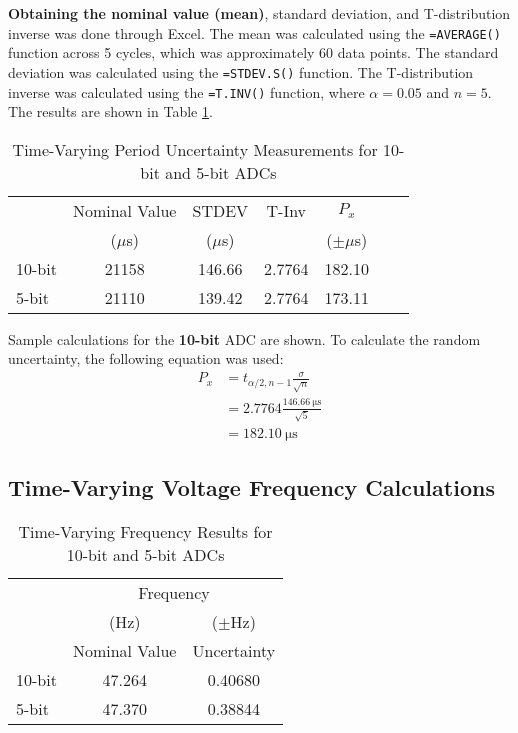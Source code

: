 \noindent \textbf{Obtaining the nominal value (mean)}, standard deviation, and T-distribution inverse was done through Excel. The mean was calculated using the \texttt{=AVERAGE()} function 
across 5 cycles, which was approximately 60 data points. The standard deviation was calculated using the \texttt{=STDEV.S()} function. 
The T-distribution inverse was calculated using the \texttt{=T.INV()} function, where $\alpha = 0.05$ and $n = 5$. The results are shown in Table 
\ref{tab:time-varying-period-uncertainty-measurements}.

\begin{table}[h]
   \centering
   \caption{Time-Varying Period Uncertainty Measurements for 10-bit and 5-bit ADCs}
   \label{tab:time-varying-period-uncertainty-measurements}
   \begin{tabular}{lcccccc}
      \toprule
      & Nominal Value & STDEV & T-Inv & $P_x$ \\
      & ($\mu$s)      & ($\mu$s)           &                        & ($\pm\mu$s)    \\
      \midrule
      10-bit & 21158 & 146.66 & 2.7764 & 182.10 \\
      5-bit  & 21110 & 139.42 & 2.7764 & 173.11 \\
      \bottomrule
   \end{tabular}
\end{table}

Sample calculations for the \textbf{10-bit} ADC are shown. To calculate the random uncertainty, the following equation was used:
\[
\begin{aligned}
   P_x &= t_{\alpha/2, n-1} \frac{\sigma}{\sqrt{n}} \\
         &= 2.7764 \frac{\qty{146.66}{\micro\second}}{\sqrt{5}} \\
         &= \boxed{\qty{182.10}{\micro\second}}
\end{aligned}
\]

\subsection{Time-Varying Voltage Frequency Calculations}
\begin{table}[h]
   \centering
   \caption{Time-Varying Frequency Results for 10-bit and 5-bit ADCs}
   \label{tab:time-varying-frequency-measurements}
   \begin{tabular}{lcc}
   \toprule
      & \multicolumn{2}{c}{Frequency}    \\
      & (Hz) & ($\pm$Hz) \\
   \cmidrule{2-3}
   & Nominal Value & Uncertainty \\
   \midrule
   10-bit & 47.264 & 0.40680 \\
   5-bit  & 47.370 & 0.38844 \\
   \bottomrule
   \end{tabular}
\end{table}

